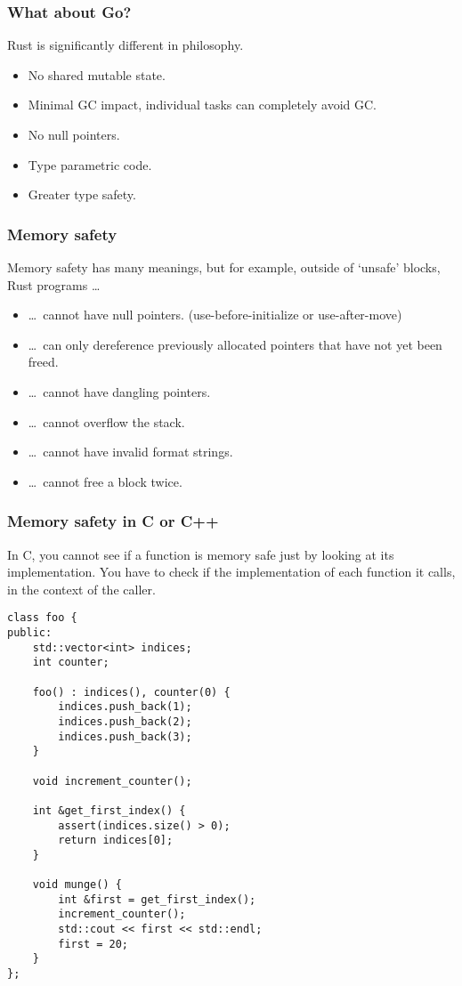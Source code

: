 \documentclass{beamer}
\begin{document}
\begin{frame}
  \frametitle{What about Go?}

  Rust is significantly different in philosophy.

  \begin{itemize}
    \item No shared mutable state.
    \item Minimal GC impact, individual tasks can completely avoid GC.
    \item No null pointers.
    \item Type parametric code.
    \item Greater type safety.
  \end{itemize}
\end{frame}



\begin{frame}
  \frametitle{Memory safety}

  Memory safety has many meanings, but for example, outside of `unsafe' blocks, Rust programs \ldots

  \begin{itemize}
    \item \ldots\ cannot have null pointers. (use-before-initialize or use-after-move)
    \item \ldots\ can only dereference previously allocated pointers that have not yet been freed.
    \item \ldots\ cannot have dangling pointers.
    \item \ldots\ cannot overflow the stack.
    \item \ldots\ cannot have invalid format strings.
    \item \ldots\ cannot free a block twice.
  \end{itemize}
\end{frame}



\begin{frame}
  \frametitle{Memory safety in C or C++}

  In C, you cannot see if a function is memory safe just by looking at its implementation. \pause
  You have to check if the implementation of each function it calls, in the context of the caller.
\end{frame}



\begin{frame}
  \begin{verbatim}
class foo {
public:
    std::vector<int> indices;
    int counter;

    foo() : indices(), counter(0) {
        indices.push_back(1);
        indices.push_back(2);
        indices.push_back(3);
    }

    void increment_counter();

    int &get_first_index() {
        assert(indices.size() > 0);
        return indices[0];
    }

    void munge() {
        int &first = get_first_index();
        increment_counter();
        std::cout << first << std::endl;
        first = 20;
    }
};
  \end{verbatim}
\end{frame}
\end{document}
